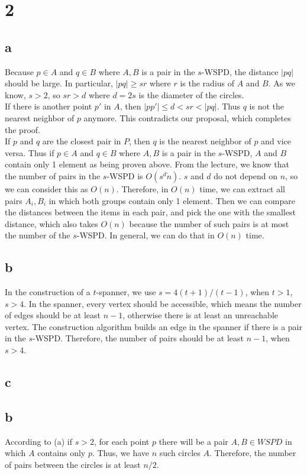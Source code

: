 \section*{2}
\subsection*{a}

Because $p \in A$ and $q \in B$ where ${A,B}$ is a pair in the $s$-WSPD, the distance $|pq|$ should be large. In particular, $|pq| \geq sr$ where $r$ is the radius of $A$ and $B$. As we know, $s > 2$, so $sr > d$ where $d = 2s$ is the diameter of the circles. \\

If there is another point $p'$ in $A$, then $|pp'| \leq d < sr < |pq|$. Thus $q$ is not the nearest neighbor of $p$ anymore. This contradicts our proposal, which completes the proof.\\

If $p$ and $q$ are the closest pair in $P$, then $q$ is the nearest neighbor of $p$ and vice versa. Thus if $p \in A$ and $q \in B$ where ${A,B}$ is a pair in the $s$-WSPD, $A$ and $B$ contain only 1 element as being proven above. From the lecture, we know that the number of pairs in the $s$-WSPD is $O(s^d \dot n)$. $s$ and $d$ do not depend on $n$, so we can consider this as $O(n)$. Therefore, in $O(n)$ time, we can extract all pairs ${A_i, B_i}$ in which both groups contain only 1 element. Then we can compare the distances between the items in each pair, and pick the one with the smallest distance, which also takes $O(n)$ because the number of such pairs is at most the number of the $s$-WSPD. In general, we can do that in $O(n)$ time.\\

\subsection*{b}
In the construction of a $t$-spanner, we use $s = 4(t + 1) / (t - 1)$, when $t > 1$, $s > 4$. In the spanner, every vertex should be accessible, which means the number of edges should be at least $n - 1$, otherwise there is at least an unreachable vertex. The construction algorithm builds an edge in the spanner if there is a pair in the $s$-WSPD. Therefore, the number of pairs should be at least $n - 1$, when $s > 4$. \\

\subsection*{c}

\subsection*{b}
According to (a) if $s > 2$, for each point $p$ there will be a pair ${A,B} \in WSPD$ in which $A$ contains only $p$.
Thus, we have $n$ such circles $A$. Therefore, the number of pairs between the circles is at least $n/2$. \\
